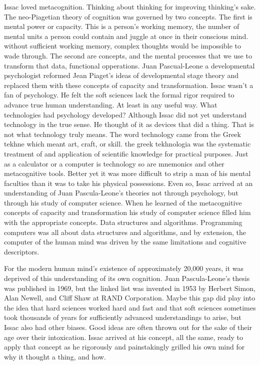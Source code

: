 Issac loved metacognition. Thinking about thinking for improving thinking's sake. The neo\hyp{}Piagetian theory of cognition was governed by two concepts. The first is mental power or capacity. This is a person's working memory, the number of mental units a person could contain and juggle at once in their conscious mind. without sufficient working memory, complex thoughts would be impossible to wade through. The second are concepts, and the mental processes that we use to transform that data, functional opperations. Juan Pascual\hyp{}Leone a developmental psychologist reformed Jean Piaget's ideas of developmental stage theory and replaced them with these concepts of capacity and transformation. Issac wasn't a fan of psychology. He felt the soft sciences lack the formal rigor required to advance true human understanding. At least in any useful way. What technologies had psychology developed? Although Issac did not yet understand technology in the true sense. He thought of it as devices that did a thing. That is not what technology truly means. The word technology came from the Greek tekhne which meant art, craft, or skill. the greek tekhnologia was the systematic treatment of and application of scientific knowledge for practical purposes. Just as a calculator or a computer is technology so are mnemonics and other metacognitive tools. Better yet it was more difficult to strip a man of his mental faculties than it was to take his physical possessions. Even so, Issac arrived at an understanding of Juan Pascula\hyp{}Leone's theories not through psychology, but through his study of computer science. When he learned of the metacognitive concepts of capacity and transformation his study of computer science filled him with the appropriate concepts. Data structures and algorithms. Programming computers was all about data structures and algorithms, and by extension, the computer of the human mind was driven by the same limitations and cognitive descriptors.

For the modern human mind's existence of approximately 20,000 years, it was deprived of this understanding of its own cognition. Juan Pascula\hyp{}Leone's thesis was published in 1969, but the linked list was invented in 1953 by Herbert Simon, Alan Newell, and Cliff Shaw at RAND Corporation. Maybe this gap did play into the idea that hard sciences worked hard and fast and that soft sciences sometimes took thousands of years for sufficiently advanced understandings to arise, but Issac also had other biases. Good ideas are often thrown out for the sake of their age over their intoxication. Issac arrived at his concept, all the same, ready to apply that concept as he rigorously and painstakingly grilled his own mind for why it thought a thing, and how.

